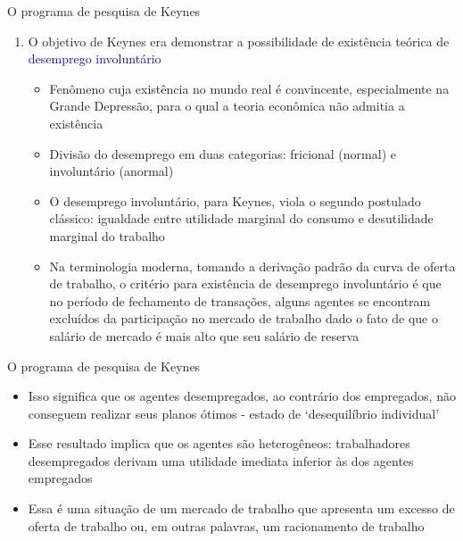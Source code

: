 \documentclass[10pt]{beamer}
\begin{document}
\begin{frame}{O programa de pesquisa de Keynes}
        \begin{enumerate}
            \item O objetivo de Keynes era demonstrar a possibilidade de existência teórica de \textcolor{blue}{desemprego involuntário}\bigskip
            \begin{itemize}
                \item Fenômeno cuja existência no mundo real é convincente, especialmente na Grande Depressão, para o qual a teoria econômica não admitia a existência\medskip
                \item Divisão do desemprego em duas categorias: fricional (normal) e involuntário (anormal)\medskip
                \item O desemprego involuntário, para Keynes, viola o segundo postulado clássico: igualdade entre utilidade marginal do consumo e desutilidade marginal do trabalho\medskip
                \item Na terminologia moderna, tomando a derivação padrão da curva de oferta de trabalho, o critério para existência de desemprego involuntário é que no período de fechamento de transações, alguns agentes se encontram excluídos da participação no mercado de trabalho dado o fato de que o salário de mercado é mais alto que seu salário de reserva
            \end{itemize}            
        \end{enumerate}
\end{frame}

\begin{frame}{O programa de pesquisa de Keynes}
  \begin{itemize}
      \item Isso significa que os agentes desempregados, ao contrário dos empregados, não conseguem realizar seus planos ótimos - estado de `desequilíbrio individual'\bigskip
      \item Esse resultado implica que os agentes são heterogêneos: trabalhadores desempregados derivam uma utilidade imediata inferior às dos agentes empregados\bigskip
      \item Essa é uma situação de um mercado de trabalho que apresenta um excesso de oferta de trabalho ou, em outras palavras, um racionamento de trabalho
  \end{itemize}
\end{frame}
\end{document}
